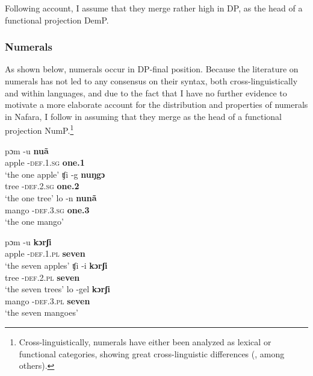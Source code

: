\documentclass[output=paper]{langscibook}
\begin{document}
\ea\label{ex:baron:5}

\z
\z

Following  account, I assume that they merge rather high in DP, as the head of a functional projection DemP. 


\subsubsection{Numerals}
\label{sec:baron:2.1.4}
As shown below, numerals occur in DP-final position. Because the literature on numerals has not led to any consensus on their syntax, both cross-linguistically and within languages, and due to the fact that I have no further evidence to motivate a more elaborate account for the distribution and properties of numerals in Nafara, I follow \citet{Cinque2005} in assuming that they merge as the head of a functional projection NumP.\footnote{Cross-linguistically, numerals have either been analyzed as lexical or functional categories, showing great cross-linguistic differences (\citealt{Danon2012,Ionin2006}, among others).} 


\ea\label{ex:baron:6}
\ea
\gll pɔm   -u   \textbf{nuã} \\
apple -\textsc{def.1.sg}   \textbf{one.\textsc{1}}   \\
\glt ‘the one apple’
\ex
\gll ʧi   -g   \textbf{nuŋgɔ}   \\
tree -\textsc{def.2.sg}    \textbf{one.\textsc{2}}     \\
\glt ‘the one tree’
\ex
\gll lo   -n   \textbf{nunã}\\
mango -\textsc{def.3.sg}    \textbf{one.\textsc{3}}\\
\glt ‘the one mango’    
\z
\z

\ea\label{ex:baron:7}
\ea
\gll pɔm -u \textbf{kɔrʃi}   \\
apple -\textsc{def.1.pl} \textbf{seven}     \\
\glt ‘the seven apples’
\ex
\gll ʧi -i \textbf{kɔrʃi}           \\
tree -\textsc{def.2.pl} \textbf{seven}  \\
\glt ‘the seven trees’
\ex
\gll lo -gel \textbf{kɔrʃi}\\
mango -\textsc{def.3.pl} \textbf{seven}\\
\glt ‘the seven mangoes’
\z
\z
\end{document}
